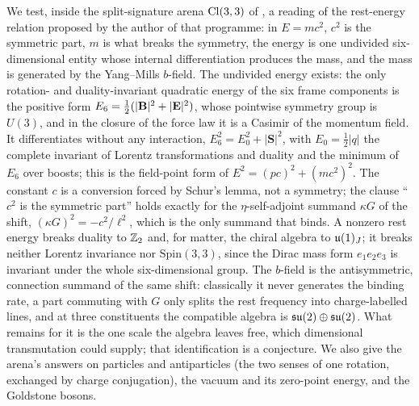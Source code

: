 \noindent
We test, inside the split-signature arena $\mathrm{Cl}(3,3)$ of \cite{ES17}, a reading of the rest-energy relation proposed by the author of that
programme: in $E=mc^2$, $c^2$ is the symmetric part, $m$ is what breaks the symmetry, the energy is one undivided six-dimensional entity
whose internal differentiation produces the mass, and the mass is generated by the Yang--Mills $b$-field. The undivided energy exists:
the only rotation- and duality-invariant quadratic energy of the six frame components is the positive form
$E_6=\tfrac12(|\mathbf B|^2+|\mathbf E|^2)$, whose pointwise symmetry group is $U(3)$, and in the closure of the force law it is a Casimir of the momentum
field. It differentiates without any interaction, $E_6^2=E_0^2+|\mathbf S|^2$, with $E_0=\tfrac12|q|$ the complete invariant of Lorentz
transformations and duality and the minimum of $E_6$ over boosts; this is the field-point form of $E^2=(pc)^2+(mc^2)^2$. The constant
$c$ is a conversion forced by Schur's lemma, not a symmetry; the clause ``$c^2$ is the symmetric part'' holds exactly for the
$\eta$-self-adjoint summand $\kappa G$ of the shift, $(\kappa G)^2=-c^2/\ell^2$, which is the only summand that binds. A nonzero rest energy
breaks duality to $\mathbb{Z}_2$ and, for matter, the chiral algebra to $\mathfrak{u}(1)_J$; it breaks neither Lorentz invariance nor $\mathrm{Spin}(3,3)$,
since the Dirac mass form $e_1e_2e_3$ is invariant under the whole six-dimensional group. The $b$-field is the antisymmetric, connection
summand of the same shift: classically it never generates the binding rate, a part commuting with $G$ only splits the rest frequency into
charge-labelled lines, and at three constituents the compatible algebra is $\mathfrak{su}(2)\oplus\mathfrak{su}(2)$. What remains for it is the one scale the algebra
leaves free, which dimensional transmutation could supply; that identification is a conjecture. We also give the arena's answers on
particles and antiparticles (the two senses of one rotation, exchanged by charge conjugation), the vacuum and its zero-point energy, and
the Goldstone bosons.

